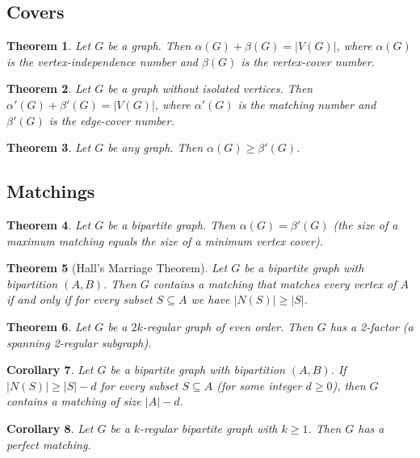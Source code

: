 \documentclass{article}
\newtheorem{theorem}{Theorem}[section]
\newtheorem{corollary}[theorem]{Corollary}
\begin{document}
\subsection{Covers}
\begin{theorem}
Let $G$ be a graph. Then $\alpha(G) + \beta(G) = |V(G)|$, where $\alpha(G)$ is the vertex-independence number and $\beta(G)$ is the vertex-cover number.
\end{theorem}

\begin{theorem}
Let $G$ be a graph without isolated vertices. Then $\alpha'(G) + \beta'(G) = |V(G)|$, where $\alpha'(G)$ is the matching number and $\beta'(G)$ is the edge-cover number.
\end{theorem}

\begin{theorem}
Let $G$ be any graph. Then $\alpha(G)\ge \beta'(G)$.
\end{theorem}

\subsection{Matchings}
\begin{theorem}
Let $G$ be a bipartite graph. Then $\alpha(G) = \beta'(G)$ (the size of a maximum matching equals the size of a minimum vertex cover).
\end{theorem}

\begin{theorem}[Hall's Marriage Theorem]
Let $G$ be a bipartite graph with bipartition $(A,B)$. Then $G$ contains a matching that matches every vertex of $A$ if and only if for every subset $S\subseteq A$ we have $|N(S)|\ge |S|$.
\end{theorem}

\begin{theorem}
Let $G$ be a $2k$-regular graph of even order. Then $G$ has a 2-factor (a spanning 2-regular subgraph).
\end{theorem}

\begin{corollary}
Let $G$ be a bipartite graph with bipartition $(A,B)$. If $|N(S)| \ge |S| - d$ for every subset $S\subseteq A$ (for some integer $d\ge 0$), then $G$ contains a matching of size $|A| - d$.
\end{corollary}

\begin{corollary}
Let $G$ be a $k$-regular bipartite graph with $k\ge 1$. Then $G$ has a perfect matching.
\end{corollary}
\end{document}
